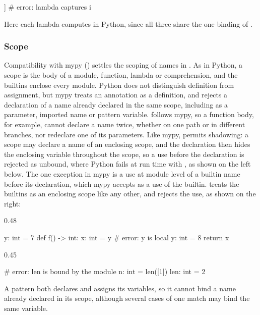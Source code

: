 \begin{python}
[lambda x: x**i for i in [1, 2, 3]] # error: lambda captures i
\end{python}

\noindent Here each lambda computes  in Python, since all three share the one binding of
.

\subsubsection{Scope}
\label{sec:scope}

Compatibility with mypy () settles the scoping of names in \PurePy. As in Python, a
scope is the body of a module, function, lambda or comprehension, and the builtins enclose every module. Python
does not distinguish definition from assignment, but mypy treats an annotation as a definition, and rejects a
declaration of a name already declared in the same scope, including as a parameter, imported name or pattern
variable. \PurePy follows mypy, so a function body, for example, cannot declare a name twice, whether on one path
or in different branches, nor redeclare one of its parameters. Like mypy, \PurePy permits shadowing: a scope may
declare a name of an enclosing scope, and the declaration then hides the enclosing variable throughout the scope,
so a use before the declaration is rejected as unbound, where Python fails at run time with
, as shown on the left below. The one exception in mypy is a use at module level of a
builtin name before its declaration, which mypy accepts as a use of the builtin. \PurePy treats
the builtins as an enclosing scope like any other, and rejects the use, as shown on the right:
\begin{listingrow}
\begin{listingcol}{0.48\textwidth}
\begin{python}
y: int = 7
def f() -> int:
    x: int = y  # error: y is local
    y: int = 8
    return x
\end{python}
\end{listingcol}
\begin{listingcol}{0.45\textwidth}
\begin{python}
# error: len is bound by the module
n: int = len([1])
len: int = 2
\end{python}
\end{listingcol}
\end{listingrow}
\noindent A pattern both declares and assigns its variables, so it cannot bind a name already declared
in its scope, although several cases of one match may bind the same variable.

